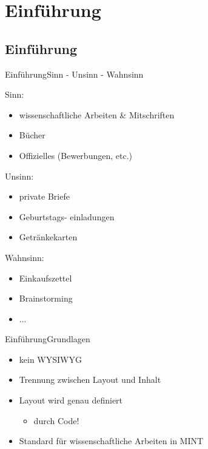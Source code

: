 \section{Einf\"uhrung}\subsection{Einf\"uhrung}
\begin{frame}{Einf\"uhrung}{Sinn - Unsinn - Wahnsinn}
   \begin{multicols}{3}
   Sinn:
   \begin{itemize}
       \item wissenschaftliche Arbeiten \& Mitschriften
       \item B\"ucher
       \item Offizielles (Bewerbungen, etc.)
   \end{itemize}
   \columnbreak\pause
 
   Unsinn:
   \begin{itemize}
       \item private Briefe
       \item Geburtstags- einladungen
       \item Getr\"ankekarten
   \end{itemize}
   \columnbreak\pause
   
   Wahnsinn:
   \begin{itemize}
       \item Einkaufszettel
       \item Brainstorming
       \item ...
   \end{itemize}
   \end{multicols} 
\end{frame}
\begin{frame}{Einf\"uhrung}{Grundlagen}
    \begin{itemize}
        \item kein WYSIWYG\pause
        \item Trennung zwischen Layout und Inhalt\pause
        \item Layout wird genau definiert\pause
        \begin{itemize}
            \item durch Code!\pause
        \end{itemize}
        \item Standard f\"ur wissenschaftliche Arbeiten in MINT
    \end{itemize}
\end{frame}
